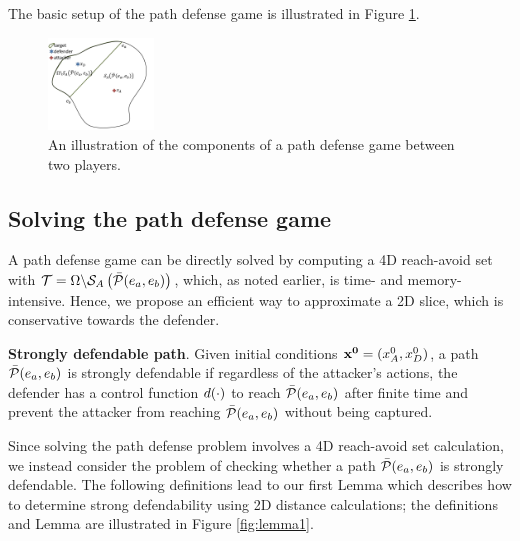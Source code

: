 The basic setup of the path defense game is illustrated in Figure \ref{fig:pd_form}.
\begin{figure}[H]
\centering
\includegraphics[width=0.25\textwidth]{"fig/path defense game"}
\caption{An illustration of the components of a path defense game between two players.}
\label{fig:pd_form}
\end{figure}

\subsection{Solving the path defense game}
A path defense game can be directly solved by computing a 4D reach-avoid set with $\mathcal{T}=\Omega\backslash\mathcal{S}_A\left(\bar{\mathcal{P}}(e_a,e_b)\right)$, which, as noted earlier, is time- and memory- intensive. Hence, we propose an efficient way to approximate a 2D slice, which is conservative towards the defender.


\begin{defn} %
\textbf{Strongly defendable path}. Given initial conditions $\mathbf{x^0}=(x_A^0,x_D^0)$, a path $\bar{\mathcal{P}}(e_a,e_b)$ is strongly defendable if regardless of the attacker's actions, the defender has a control function $d(\cdot)$ to reach $\bar{\mathcal{P}}(e_a,e_b)$ after finite time and prevent the attacker from reaching $\bar{\mathcal{P}}(e_a,e_b)$ without being captured. %
\end{defn}


Since solving the path defense problem involves a 4D reach-avoid set calculation, we instead consider the problem of checking whether a path $\bar{\mathcal{P}}(e_a,e_b)$ is strongly defendable. The following definitions lead to our first Lemma which describes how to determine strong defendability using 2D distance calculations; the definitions and Lemma are illustrated in Figure \ref{fig:lemma1}.

